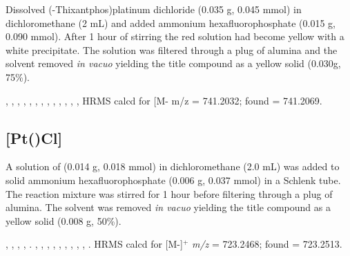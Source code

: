 
Dissolved (\tBu-Thixantphos)platinum dichloride (0.035 g, 0.045 mmol) in dichloromethane (2 mL) and added ammonium hexafluorophosphate (0.015 g, 0.090 mmol).  After 1 hour of stirring the red solution had become yellow with a white precipitate.  The solution was filtered through a plug of alumina and the solvent removed \emph{in vacuo} yielding the title compound as a yellow solid (0.030g, 75\%).  

,
,
,
,
,
,
,
,
,
,
,
,
,
HRMS calcd for  [M-\ce{PF6]+} m/z = 741.2032; found = 741.2069.


\subsection*{[Pt(\tBuxantphosk)Cl]}
%

A solution of \tBuxantphos{} (0.014 g, 0.018 mmol) in dichloromethane (2.0 mL) was added to solid ammonium hexafluorophosphate (0.006 g, 0.037 mmol) in a Schlenk tube.  The reaction mixture was stirred for 1 hour before filtering through a plug of alumina.  The solvent was removed \emph{in vacuo} yielding the title compound as a yellow solid (0.008 g, 50\%).  

,
,
,
,
.
,
,
,
,
,
,
,
,
,
.
HRMS calcd for  [M-]$^+$ \emph{m/z} = 723.2468; found = 723.2513.

